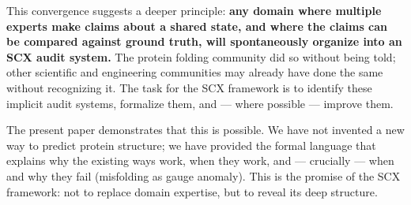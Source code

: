 \documentclass[12pt,a4paper]{article}
\theoremstyle{remark}
\begin{document}
This convergence suggests a deeper principle: \textbf{any domain where multiple experts make claims about a shared state, and where the claims can be compared against ground truth, will spontaneously organize into an SCX audit system.}
The protein folding community did so without being told; other scientific and engineering communities may already have done the same without recognizing it.
The task for the SCX framework is to identify these implicit audit systems, formalize them, and — where possible — improve them.

The present paper demonstrates that this is possible.
We have not invented a new way to predict protein structure; we have provided the formal language that explains why the existing ways work, when they work, and — crucially — when and why they fail (misfolding as gauge anomaly).
This is the promise of the SCX framework: not to replace domain expertise, but to reveal its deep structure.
\end{document}
